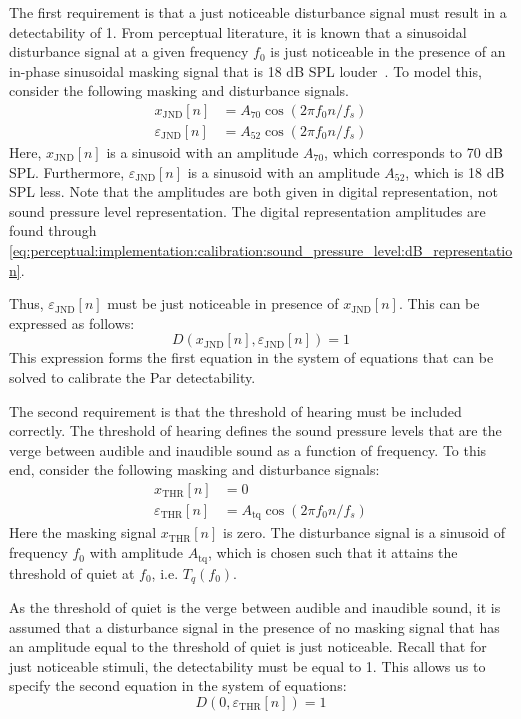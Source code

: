 The first requirement is that a just noticeable disturbance signal must result in a detectability of 1.
From perceptual literature, it is known that a sinusoidal disturbance signal at a given frequency $f_0$ is just noticeable in the presence of an in-phase sinusoidal masking signal that is 18 dB SPL louder~\cite{van2005perceptual}.
To model this, consider the following masking and disturbance signals. 
\begin{align}
    x_\text{JND}[n] &= A_{70}\cos\left(2\pi f_0 n / f_s\right) \\
    \varepsilon_\text{JND}[n] &= A_{52}\cos\left(2\pi f_0 n / f_s\right)
\end{align}
Here, $x_\text{JND}[n]$ is a sinusoid with an amplitude $A_{70}$, which corresponds to 70 dB SPL.
Furthermore, $\varepsilon_\text{JND}[n]$ is a sinusoid with an amplitude $A_{52}$, which is 18 dB SPL less.
Note that the amplitudes are both given in digital representation, not sound pressure level representation.
The digital representation amplitudes are found through \autoref{eq:perceptual:implementation:calibration:sound_pressure_level:dB_representation}.

Thus, $\varepsilon_\text{JND}[n]$ must be just noticeable in presence of $x_\text{JND}[n]$.
This can be expressed as follows:
\begin{equation}
    D(x_\text{JND}[n],\varepsilon_\text{JND}[n]) = 1
    \label{eq:perceptual:implementation:calibration:coefficients:first}
\end{equation}
This expression forms the first equation in the system of equations that can be solved to calibrate the Par detectability.

The second requirement is that the threshold of hearing must be included correctly.
The threshold of hearing defines the sound pressure levels that are the verge between audible and inaudible sound as a function of frequency.
To this end, consider the following masking and disturbance signals:
\begin{align}
    x_\text{THR}[n] &= 0 \\
    \varepsilon_\text{THR}[n] &= A_{\text{tq}}\cos\left(2\pi f_0 n / f_s\right)
\end{align}
Here the masking signal $x_\text{THR}[n]$ is zero. 
The disturbance signal is a sinusoid of frequency $f_0$ with amplitude $A_{\text{tq}}$, which is chosen such that it attains 
the threshold of quiet at $f_0$, i.e. $T_q(f_0)$. 

As the threshold of quiet is the verge between audible and inaudible sound, it is assumed that a disturbance signal in the presence of no masking signal that has
an amplitude equal to the threshold of quiet is just noticeable.
Recall that for just noticeable stimuli, the detectability must be equal to 1.
This allows us to specify the second equation in the system of equations:
\begin{equation}
    D(0,\varepsilon_\text{THR}[n]) = 1
    \label{eq:perceptual:implementation:calibration:coefficients:second}
\end{equation}

